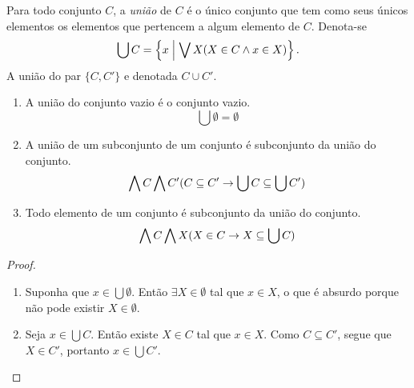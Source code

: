 \begin{definition}
Para todo conjunto $C$, a \emph{união} de $C$ é o único conjunto que tem como seus únicos elementos os elementos que pertencem a algum elemento de $C$. Denota-se
	\begin{equation*}
	\bigcup C = \left\{{x}\;\middle\vert\;{\bigvee\nolimits X(X \in C \land x \in X)}\right\}.
	\end{equation*}
A união do par $\{C,C'\}$ e denotada $C \cup C'$.
\end{definition}

\begin{proposition}
	\begin{enumerate}
	\item A união do conjunto vazio é o conjunto vazio.
		\begin{equation*}
		\bigcup \emptyset = \emptyset
		\end{equation*}

	\item A união de um subconjunto de um conjunto é subconjunto da união do conjunto.
		\begin{equation*}
		\bigwedge\nolimits C \bigwedge\nolimits C' (C \subseteq C' \rightarrow \bigcup C \subseteq \bigcup C')
		\end{equation*}
	
	\item Todo elemento de um conjunto é subconjunto da união do conjunto.
		\begin{equation*}
		\bigwedge\nolimits C \bigwedge\nolimits X (X \in C \rightarrow X \subseteq \bigcup C)
		\end{equation*}
	\end{enumerate}
\end{proposition}
\begin{proof}
	\begin{enumerate}
	\item Suponha que $x \in \bigcup \emptyset$. Então $\exists X \in \emptyset$ tal que $x \in X$, o que é absurdo porque não pode existir $X \in \emptyset$.
	
	\item Seja $x \in \bigcup C$. Então existe $X \in C$ tal que $x \in X$. Como $C \subseteq C'$, segue que $X \in C'$, portanto $x \in \bigcup C'$. \qedhere
	\end{enumerate}
\end{proof}

